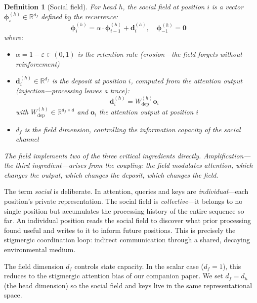\documentclass[11pt,a4paper]{article}
\newtheorem{definition}{Definition}
\newcommand{\field}{\bm{\phi}}
\newcommand{\evap}{\varepsilon}
\newcommand{\retain}{\alpha}
\newcommand{\R}{\mathbb{R}}
\begin{document}
\begin{definition}[Social field]
\label{def:trail_field}
For head $h$, the social field at position $i$ is a vector
$\field_i^{(h)} \in \R^{d_f}$ defined by the recurrence:
\begin{equation}
    \field_i^{(h)} = \retain \cdot \field_{i-1}^{(h)} + \bm{d}_i^{(h)},
    \quad \field_{-1}^{(h)} = \bm{0}
    \label{eq:trail_recurrence}
\end{equation}
where:
\begin{itemize}
    \item $\retain = 1 - \evap \in (0, 1)$ is the retention rate
          (erosion---the field forgets without reinforcement)
    \item $\bm{d}_i^{(h)} \in \R^{d_f}$ is the deposit at
          position $i$, computed from the attention output
          (injection---processing leaves a trace):
          \begin{equation}
              \bm{d}_i^{(h)} = W_{\text{dep}}^{(h)} \bm{o}_i
              \label{eq:vector_deposit}
          \end{equation}
          with $W_{\text{dep}}^{(h)} \in \R^{d_f \times d}$ and
          $\bm{o}_i$ the attention output at position $i$
    \item $d_f$ is the \emph{field dimension}, controlling the
          information capacity of the social channel
\end{itemize}
The field implements two of the three critical ingredients directly.
Amplification---the third ingredient---arises from the coupling: the
field modulates attention, which changes the output, which changes
the deposit, which changes the field.
\end{definition}

The term \emph{social} is deliberate.  In attention, queries and keys
are \emph{individual}---each position's private representation.  The
social field is \emph{collective}---it belongs to no single position
but accumulates the processing history of the entire sequence so far.
An individual position reads the social field to discover what prior
processing found useful and writes to it to inform future positions.
This is precisely the stigmergic coordination loop: indirect
communication through a shared, decaying environmental medium.

The field dimension $d_f$ controls state capacity.  In the scalar
case ($d_f = 1$), this reduces to the stigmergic attention bias of
our companion paper.  We set $d_f = d_h$ (the head dimension) so the
social field and keys live in the same representational space.
\end{document}
